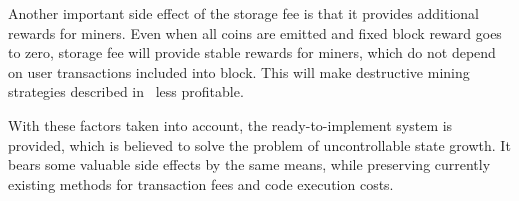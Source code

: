 \documentclass[]{llncs}   %
\begin{document}
Another important side effect of the storage fee is that it provides additional rewards 
for miners. Even when all coins are emitted and fixed block reward goes to zero,
storage fee will provide stable rewards for miners, which do not depend on user transactions included into block.
This will make destructive mining strategies described in~\cite{carlsten2016instability} less profitable.

With these factors taken into account, the ready-to-implement system is provided,
which is believed to solve the problem of uncontrollable state growth. It
bears some valuable side effects by the same means, while preserving currently
existing methods for transaction fees and code execution costs.





\end{document}

